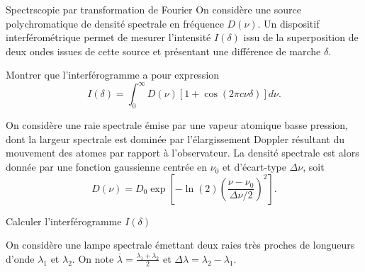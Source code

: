 
\begin{exo}[PC][1][colle]{Spectrscopie par transformation de Fourier}
  On considère une source polychromatique de  densité spectrale en fréquence $D(\nu)$. Un dispositif interférométrique permet de mesurer l'intensité $I(\delta)$ issu de la superposition de deux ondes issues de cette source et présentant une différence de marche $\delta$. 
 
  \begin{quest}
    \item Montrer que l’interférogramme a pour expression 
     \begin{equation}
    I(\delta) = \int_0^\infty D(\nu) \left[1+\cos\left(2\pi c \nu \delta \right)\right] d\nu.
    \end{equation}
  \end{quest}
  On considère une raie spectrale émise par une vapeur atomique basse pression, dont la largeur spectrale est dominée par l’élargissement Doppler résultant du mouvement des atomes par rapport à l’observateur. La densité spectrale est alors donnée par une fonction gaussienne centrée en $\nu_0$ et d’écart-type $\Delta \nu$, soit
    \begin{equation}
    D(\nu) = D_0 \exp\left[-\ln(2)\left(\frac{\nu - \nu_0}{\Delta \nu /2}\right)^2\right].
    \end{equation}
    \begin{quest}
      \item	
    \item Calculer l’interférogramme $I(\delta)$ 
    \item On considère une lampe spectrale émettant deux raies très proches de longueurs d'onde $\lambda_1$ et $\lambda_2$. On note $\overline{\lambda} = \frac{\lambda_1 + \lambda_2}{2}$ et $\Delta \lambda = \lambda_2 - \lambda_1$.
  \end{quest}
\end{exo}

